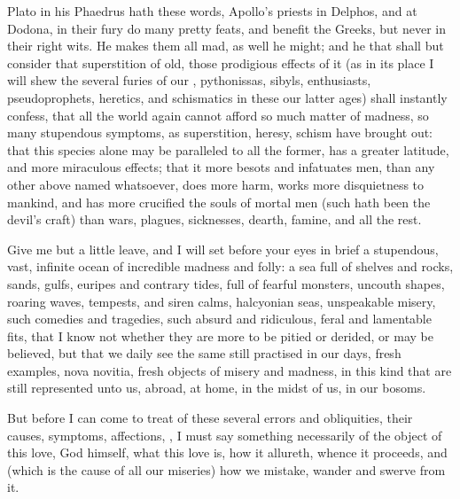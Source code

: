 {Plato in his Phaedrus hath these words, Apollo's priests in
Delphos, and at Dodona, in their fury do many pretty feats, and benefit
the Greeks, but never in their right wits. He makes them all mad, as
well he might; and he that shall but consider that superstition of old,
those prodigious effects of it (as in its place I will shew the several
furies of our , pythonissas, sibyls, enthusiasts,
pseudoprophets, heretics, and schismatics in these our latter ages)
shall instantly confess, that all the world again cannot afford so much
matter of madness, so many stupendous symptoms, as superstition,
heresy, schism have brought out: that this species alone may be
paralleled to all the former, has a greater latitude, and more
miraculous effects; that it more besots and infatuates men, than any
other above named whatsoever, does more harm, works more disquietness
to mankind, and has more crucified the souls of mortal men (such hath
been the devil's craft) than wars, plagues, sicknesses, dearth, famine,
and all the rest.

Give me but a little leave, and I will set before your eyes in brief a
stupendous, vast, infinite ocean of incredible madness and folly: a sea
full of shelves and rocks, sands, gulfs, euripes and contrary tides,
full of fearful monsters, uncouth shapes, roaring waves, tempests, and
siren calms, halcyonian seas, unspeakable misery, such comedies and
tragedies, such absurd and ridiculous, feral and lamentable fits, that
I know not whether they are more to be pitied or derided, or may be
believed, but that we daily see the same still practised in our days,
fresh examples, nova novitia, fresh objects of misery and madness, in
this kind that are still represented unto us, abroad, at home, in the
midst of us, in our bosoms.

But before I can come to treat of these several errors and obliquities,
their causes, symptoms, affections, \etc{}, I must say something
necessarily of the object of this love, God himself, what this love is,
how it allureth, whence it proceeds, and (which is the cause of all our
miseries) how we mistake, wander and swerve from it.

}
